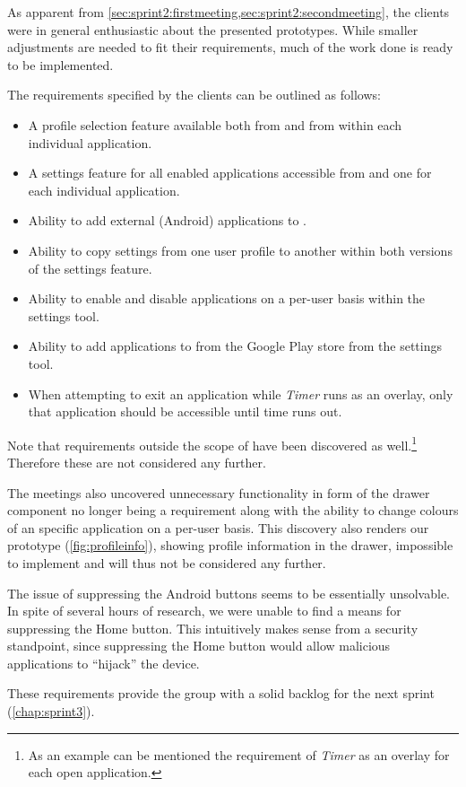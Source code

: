 As apparent from \cref{sec:sprint2:firstmeeting,sec:sprint2:secondmeeting}, the clients were in general enthusiastic about the presented prototypes.
While smaller adjustments are needed to fit their requirements, much of the work done is ready to be implemented.

The requirements specified by the clients can be outlined as follows:

\begin{itemize}
\item A profile selection feature available both from \launcher and from within each individual application.
\item A settings feature for all enabled applications accessible from \launcher and one for each individual application.
\item Ability to add external (Android) applications to \launcher.
\item Ability to copy settings from one user profile to another within both versions of the settings feature.
\item Ability to enable and disable applications on a per-user basis within the \launcher settings tool.
\item Ability to add applications to \launcher from the Google Play store from the \launcher settings tool.
\item When attempting to exit an application while \textit{Timer} runs as an overlay, only that application should be accessible until time runs out.
\end{itemize}

Note that requirements outside the scope of \launcher have been discovered as well.\footnote{As an example can be mentioned the requirement of \textit{Timer} as an overlay for each open application.}
Therefore these are not considered any further.

The meetings also uncovered unnecessary functionality in form of the drawer component no longer being a requirement along with the ability to change colours of an specific application on a per-user basis.
This discovery also renders our prototype (\cref{fig:profileinfo}), showing profile information in the drawer, impossible to implement and will thus not be considered any further.

The issue of suppressing the Android buttons seems to be essentially unsolvable. In spite of several hours of research, we were unable to find a means for suppressing the Home button. This intuitively makes sense from a security standpoint, since suppressing the Home button would allow malicious applications to ``hijack'' the device.

These requirements provide the group with a solid backlog for the next sprint (\cref{chap:sprint3}).